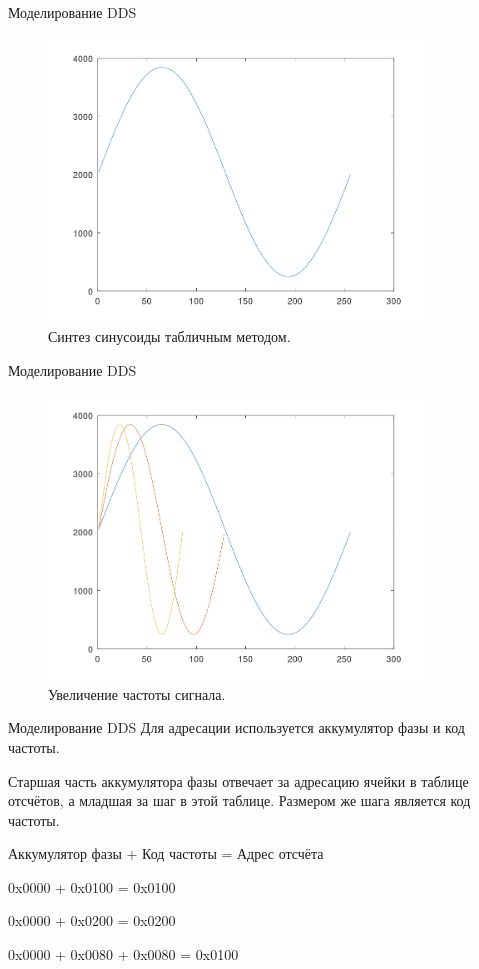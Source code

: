 \documentclass[10pt]{beamer}
\begin{document}
\begin{frame}{Моделирование DDS}
  \begin{figure}
  \includegraphics[width=0.9\textwidth]{tab_sin}
  \caption{Синтез синусоиды табличным методом.}
  \end{figure}
\end{frame}

\begin{frame}{Моделирование DDS}
  \begin{figure}
  \includegraphics[width=0.9\textwidth]{tab_sin_s}
  \caption{Увеличение частоты сигнала.}
  \end{figure}
\end{frame}


\begin{frame}[containsverbatim]{Моделирование DDS}
	Для адресации используется аккумулятор фазы и код частоты. 
	
	Старшая часть аккумулятора фазы отвечает за адресацию ячейки в таблице отсчётов, а младшая за шаг в этой таблице. Размером же шага является код частоты.

	Аккумулятор фазы + Код частоты = Адрес отсчёта 
	
	0x0000 + 0x0100 = 0x0100

	0x0000 + 0x0200 = 0x0200
	
	0x0000 + 0x0080 + 0x0080 = 0x0100
		
\end{frame}
\end{document}
